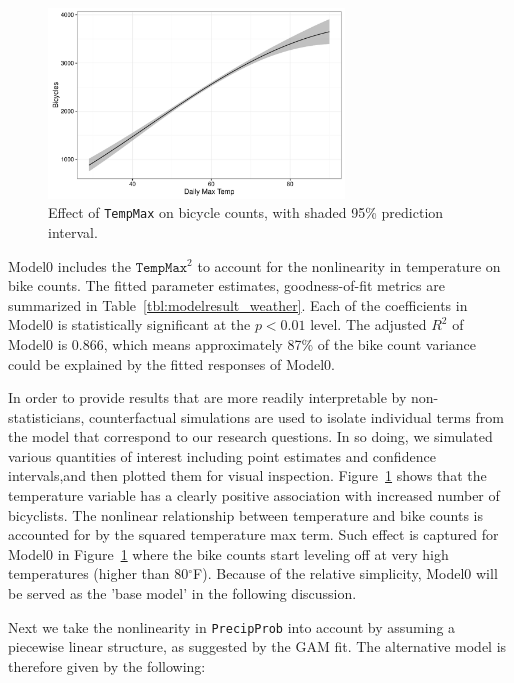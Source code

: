 \documentclass [11pt, proquest] {uwthesis}[2015/03/03]
\begin{document}
\begin{figure}
\centering
   \includegraphics[width=0.7\textwidth]{figures/sim/temperture} 
  \caption{Effect of \texttt{TempMax} on bicycle counts, with shaded 95\% prediction interval.}
  \label{fig:temp}
\end{figure}

Model0 includes the $\texttt{TempMax}^2$ to account for the nonlinearity in temperature on bike counts. The fitted parameter estimates, goodness-of-fit metrics are summarized in Table~\ref{tbl:modelresult_weather}. Each of the coefficients in Model0 is statistically significant at the $p<0.01$ level. The adjusted $R^2$ of Model0 is 0.866, which means approximately 87\% of the bike count variance could be explained by the fitted responses of Model0. 

In order to provide results that are more readily interpretable by non-statisticians, counterfactual simulations are used to isolate individual terms from the model that correspond to our research questions. In so doing, we simulated various quantities of interest including point estimates and confidence intervals,and then plotted them for visual inspection. Figure~\ref{fig:temp} shows that the temperature variable has a clearly positive association with increased number of bicyclists. The nonlinear relationship between temperature and bike counts is accounted for by the squared temperature max term. Such effect is captured for Model0 in Figure~\ref{fig:temp} where the bike counts start leveling off at very high temperatures (higher than 80$^\circ$F). Because of the relative simplicity, Model0 will be served as the 'base model' in the following discussion. 


Next we take the nonlinearity in \texttt{PrecipProb} into account by assuming a piecewise linear structure, as suggested by the GAM fit. The alternative model is therefore given by the following:
\end{document}
